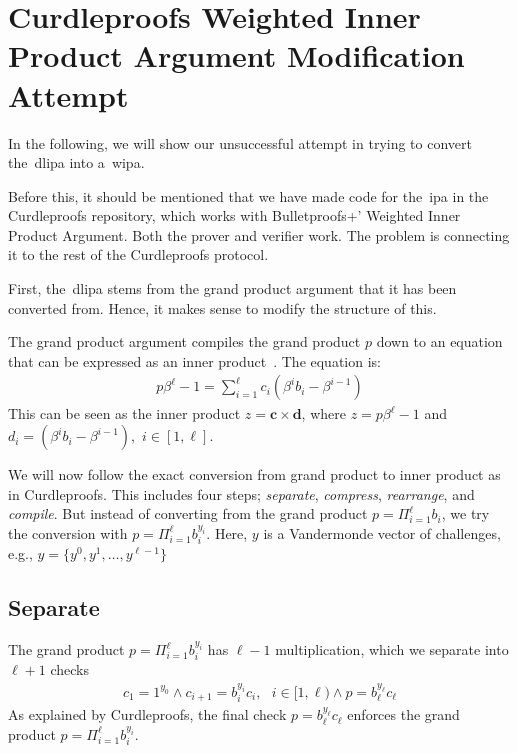 
\section{Curdleproofs Weighted Inner Product Argument Modification Attempt}\label{app:curdleproofs-weighted-inner-product-argument-modification-attempt}
In the following, we will show our unsuccessful attempt in trying to convert the~\gls{dlipa} into a~\gls{wipa}.

Before this, it should be mentioned that we have made code for the~\gls{ipa} in the Curdleproofs repository, which works with Bulletproofs+'
Weighted Inner Product Argument.
Both the prover and verifier work.
The problem is connecting it to the rest of the Curdleproofs protocol.

First, the~\gls{dlipa} stems from the grand product argument that it has been converted from.
Hence, it makes sense to modify the structure of this.

The grand product argument compiles the grand product $p$ down to an equation that can be expressed as an inner product~\cite{Curdleproofs}.
The equation is:
\begin{align}
    p\beta^{\ell}-1=\sum_{i=1}^{\ell}c_i(\beta^i  b_i-\beta^{i-1})
\end{align}
This can be seen as the inner product $z=\mathbf{c}\times\mathbf{d}$, where $z=p\beta^\ell-1$ and $d_i=(\beta^i b_i-\beta^{i-1})$,~$i\in[1,\ell]$.

We will now follow the exact conversion from grand product to inner product as in Curdleproofs.
This includes four steps; \textit{separate}, \textit{compress}, \textit{rearrange}, and \textit{compile}.
But instead of converting from the grand product $p=\Pi_{i=1}^\ell b_i$, we try the conversion with $p=\Pi_{i=1}^\ell b_i^{y_i}$.
Here, $y$ is a Vandermonde vector of challenges, e.g., $y=\{y^0,y^1,\dots,y^{\ell-1}\}$

\subsection{Separate}\label{subsec:separate}
The grand product $p=\Pi_{i=1}^\ell b_i^{y_i}$ has $\ell-1$ multiplication, which we separate into $\ell+1$ checks
\begin{align}
    c_1=1^{y_0}\land c_{i+1}=b_{i}^{y_{i}}c_i,\text{ }i\in[1,\ell)\land p=b_{\ell}^{y_{\ell}}c_{\ell}
\end{align}
As explained by Curdleproofs, the final check $p=b_{\ell}^{y_{\ell}}c_{\ell}$ enforces the grand product $p=\Pi_{i=1}^\ell b_i^{y_i}$.
